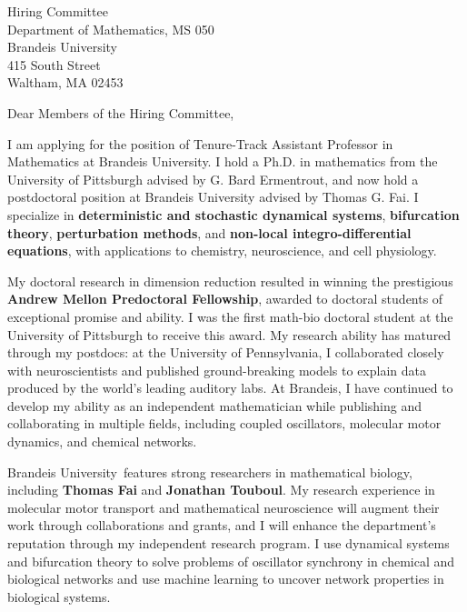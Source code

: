 \documentclass[11pt,a4paper]{letter}
\begin{document}
\def\School{Brandeis University}
\begin{letter}
{Hiring Committee\\
Department of Mathematics, MS 050\\
Brandeis University\\
415 South Street\\
Waltham, MA 02453}


\opening{Dear Members of the Hiring Committee,}

I am applying for the position of Tenure-Track Assistant Professor in Mathematics at \School. I hold a Ph.D. in mathematics from the University of Pittsburgh advised by G. Bard Ermentrout, and now hold a postdoctoral position at Brandeis University advised by Thomas G. Fai. I specialize in \textbf{deterministic and stochastic dynamical systems}, \textbf{bifurcation theory}, \textbf{perturbation methods}, and \textbf{non-local integro-differential equations}, with applications to chemistry, neuroscience, and cell physiology.

My doctoral research in dimension reduction resulted in winning the prestigious \textbf{Andrew Mellon Predoctoral Fellowship}, awarded to doctoral students of exceptional promise and ability. I was the first math-bio doctoral student at the University of Pittsburgh to receive this award. My research ability has matured through my postdocs: at the University of Pennsylvania, I collaborated closely with neuroscientists and published ground-breaking models to explain data produced by the world's leading auditory labs. At Brandeis, I have continued to develop my ability as an independent mathematician while publishing and collaborating in multiple fields, including coupled oscillators, molecular motor dynamics, and chemical networks.

\School~features strong researchers in mathematical biology, including \textbf{Thomas Fai} and \textbf{Jonathan Touboul}. My research experience in molecular motor transport and mathematical neuroscience will augment their work through collaborations and grants, and I will enhance the department's reputation through my independent research program. I use dynamical systems and bifurcation theory to solve problems of oscillator synchrony in chemical and biological networks and use machine learning to uncover network properties in biological systems.


\end{letter}
\end{document}
